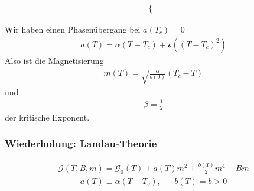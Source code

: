 \begin{description}
\begin{enumerate}[A)]
\begin{itemize}
\begin{align*}
\begin{cases}
          \end{cases}
        \end{align*}
    \end{itemize}
    Wir haben einen Phasenübergang bei $a(T_c) = 0$
    \begin{align*}
      a(T) = \alpha (T - T_c) + \mathcal{o}\left( (T - T_c)^2 \right)
    \end{align*}
    Also ist die Magnetisierung
    \begin{align*}
      m(T) = \sqrt{\frac{\alpha}{ b(0)}(T_c - T)}
    \end{align*}
    und
    \begin{align*}
      \beta = \frac{1}{2}
    \end{align*}
    der kritische Exponent.

\end{enumerate}
\subsubsection*{Wiederholung: Landau-Theorie}
%
\begin{align*}
  \mathcal{G}(T, B, m) = \mathcal{G}_0(T) + a(T) m^2 + \frac{b(T)}{2}m^4 - B m
\end{align*}
%
%
\begin{align*}
  a(T) \equiv \alpha(T - T_c), && b(T) = b > 0
\end{align*}
%

\end{description}

